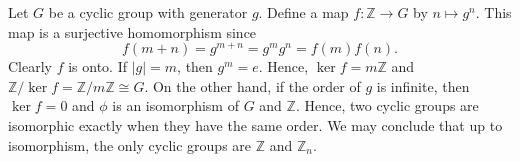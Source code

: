  
\begin{example}\label{example:homomorph:homo_cyclic}
Let $G$ be a cyclic group with generator $g$. Define a map $f :
{\mathbb Z} \rightarrow G$ by $n \mapsto g^n$.  This map is a surjective
homomorphism since  
\[
f( m + n) = g^{m+n} = g^m g^n = f(m) f(n).
\]
Clearly $f$ is onto. If $|g| = m$, then  $g^m = e$. Hence, $\ker
f = m {\mathbb Z}$ and ${\mathbb Z} / \ker f =  {\mathbb Z} / m {\mathbb Z}
\cong G$. On the other hand, if the order of $g$ is infinite, then
$\ker f = 0$ and $\phi$ is an isomorphism of $G$ and ${\mathbb Z}$.
Hence, two cyclic groups are isomorphic exactly when they have the
same order. We may conclude that up to isomorphism, the only cyclic groups are ${\mathbb Z}$
and ${\mathbb Z}_n$. 
\end{example}
 


